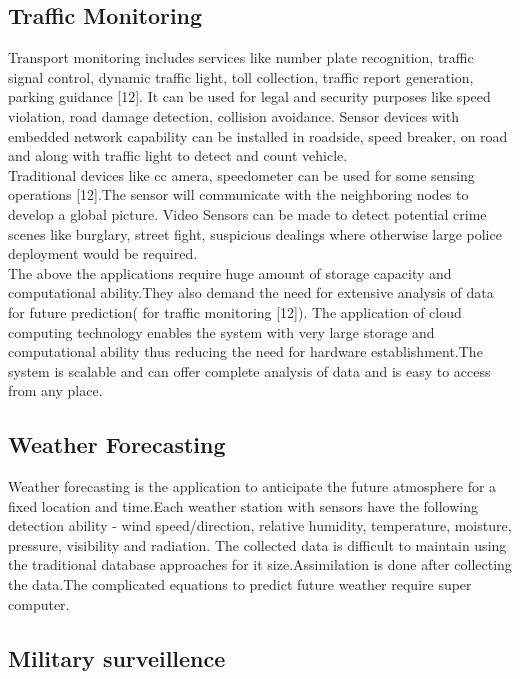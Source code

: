 \documentclass {report}
\begin{document}
\subsection{Traffic Monitoring}
Transport monitoring includes services like number plate recognition, traffic signal control, dynamic traffic light, toll collection, traffic report generation, parking guidance [12].
It can be used for legal and security purposes like speed violation, road damage detection, collision avoidance. Sensor devices with embedded network capability can be installed in roadside, speed breaker, on road and along with traffic light to detect and count vehicle.\\
\indent Traditional devices like cc amera, speedometer can be used for some sensing operations [12].The sensor will communicate with the neighboring nodes to develop a global picture.
Video Sensors can be made to detect potential crime scenes like burglary, street fight, suspicious dealings where otherwise large police deployment would be required.\\
\indent The above the applications require huge amount of storage capacity and computational ability.They also demand the need for extensive analysis of data for future prediction( for traffic monitoring [12]).
The application of cloud computing technology enables the system with very large storage and computational ability thus reducing the need for hardware establishment.The system is scalable and can offer complete analysis of data and is easy to access from any place.\\

\subsection{Weather Forecasting}
Weather forecasting is the application to anticipate the future atmosphere for a fixed location and time.Each weather station with sensors
 have the following detection ability - wind speed/direction, relative humidity, temperature, moisture, pressure, visibility and radiation.
The collected data is difficult to maintain using the traditional database approaches for it size.Assimilation is done after collecting the data.The complicated equations to predict future weather require super computer.\\


\subsection{Military surveillence}
\end{document}
